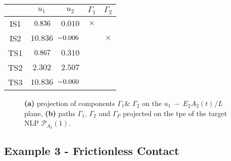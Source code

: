 \begin{table}[t]
	\centering
	\begin{minipage}{0.45\textwidth}
		\label{table:TABLE_CH4EX2}
		\small
		\renewcommand{\arraystretch}{1.25}
		\begin{tabular}{c c c c c}
			\hline\hline
			& $u_1$ & $u_2$ & $\mathit{\Gamma}_1$ & $\mathit{\Gamma}_2$ \\
			\hline
			IS1 & \hspace{2.5pt}$\hspace{2.5pt} 0.836$  & $0.010$  & $\times$   
			&            \\
			IS2 & $10.836$ & $\hspace{-5.5pt}-0.006$ &            & $\times$   
			\\
			TS1 & \hspace{2.5pt}$ \hspace{2.5pt}0.867$  & $0.310$  & \checkmark 
			&            \\
			TS2 & \hspace{5pt}$2.302$  & $2.507$  & \checkmark &            \\
			TS3 & $10.836$ & $\hspace{-6pt}-0.060$ &            & \checkmark \\
			\hline\hline
		\end{tabular}
	\end{minipage}
\end{table}

\begin{figure*}[t]
	\centering
	\qquad
	\caption{\textbf{(a)} projection of components
		$\mathit{\Gamma}_1$\& $\mathit{\Gamma}_2$ on the $u_1\ -\
		E_2A_2(t)^{}/L$ plane, \textbf{(b)} paths $\mathit{\Gamma}_1$, 
		$\mathit{\Gamma}_2$
		and $\mathit{\Gamma_P}$ projected on the \acrshort{tpe} of the target 
		NLP
		$\bm{\mathcal{P}}_{A_2}(1)$.}%
	\label{fig:FIG36}%
\end{figure*}

\subsection{Example 3 - Frictionless Contact}

